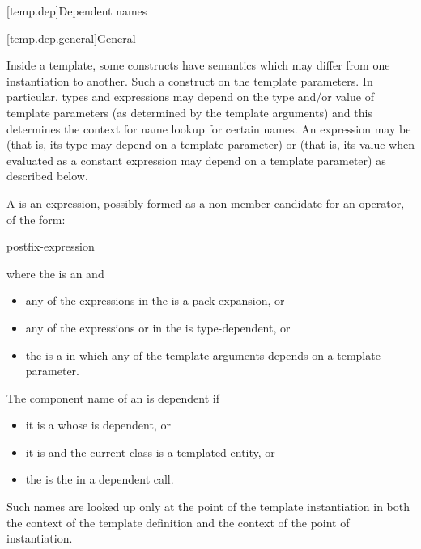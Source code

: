 [temp.dep]{Dependent names}

[temp.dep.general]{General}

\pnum
{}%
Inside a template, some constructs have semantics which may differ from one
instantiation to another.
Such a construct
on the template parameters.
In particular, types and expressions may depend on the type
and/or
value of
template parameters (as determined by the template arguments) and this determines
the context for name lookup for certain names.
An expression may be
(that is, its type may depend on a template parameter) or
(that is, its value when evaluated as a constant expression
may depend on a template parameter)
as described below.

\pnum
A  is an expression,
possibly formed as a non-member candidate for an operator,
of the form:
\begin{ncsimplebnf}
postfix-expression \terminal{(}  \terminal{)}
\end{ncsimplebnf}
where the 
is an  and
\begin{itemize}
\item
any of the expressions in the  is a pack
expansion, or
\item
any of the expressions
or 
in the
is type-dependent, or
\item
the 
is a  in which any of the template arguments depends
on a template parameter.
\end{itemize}
The component name of an 
is dependent if
\begin{itemize}
\item
it is a 
whose  is dependent, or
\item
it is  and
the current class is a templated entity, or
\item
the  is
the  in a dependent call.
\end{itemize}
\begin{note}
Such names
are looked up only at the point of the template instantiation
in both the context of the template definition and the
context of the point of instantiation.
\end{note}

